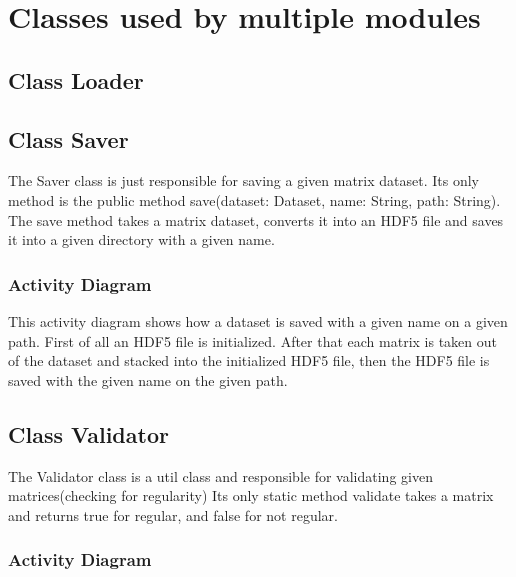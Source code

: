 \documentclass[parskip=full]{scrartcl}
\begin{document}
\newpage
\section{Classes used by multiple modules}

\subsection{Class Loader}
\subsection{Class Saver}
The Saver class is just responsible for saving a given matrix dataset.
Its only method is the public method save(dataset: Dataset, name: String, path: String).
The save method takes a matrix dataset, converts it into an HDF5 file and saves it into a given directory with a given name.
\subsubsection{Activity Diagram}
\newpage
\begin{figure}[h]
\begin{center}

\label{Activity Diagrams}
\end{center}
\end{figure}
\newpage
This activity diagram shows how a dataset is saved with a given name on a given path. First of all an HDF5 file is initialized. After that each matrix is taken out of the dataset and stacked into the initialized HDF5 file, then the HDF5 file is saved with the given name on the given path.
\subsection{Class Validator}
The Validator class is a util class and responsible for validating given matrices(checking for regularity)
Its only static method validate takes a matrix and returns true for regular, and false for not regular.
\subsubsection{Activity Diagram}
\newpage
\begin{figure}[h]
\begin{center}

\label{Activity Diagrams}
\end{center}
\end{figure}
\newpage
\end{document}
